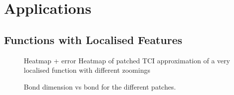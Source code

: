 \section{Applications}

\subsection{Functions with Localised Features}

\begin{figure}[ht!]
	\caption{Heatmap + error Heatmap of patched TCI approximation of a very localised function with different zoomings  }
\end{figure}

\begin{figure}[ht!]
	\caption{Bond dimension vs bond for the different patches. }
\end{figure}




